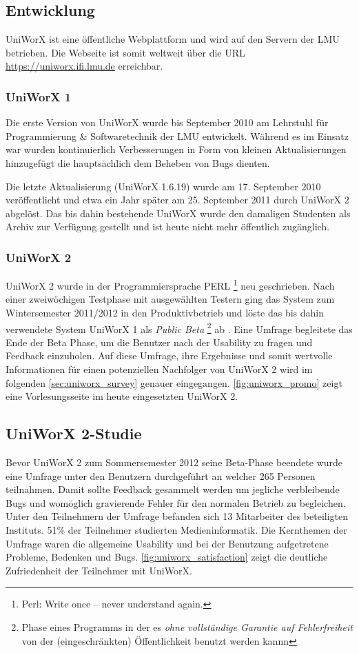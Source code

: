 \documentclass[11pt,a4paper,twoside,ngerman]{article}
\begin{document}
\subsection{Entwicklung} \label{sec:uniworx_development}
UniWorX ist eine öffentliche Webplattform und wird auf den Servern der LMU betrieben. Die Webseite ist somit weltweit über die URL \url{https://uniworx.ifi.lmu.de} erreichbar.

\subsubsection{UniWorX 1}
Die erste Version von UniWorX wurde bis September 2010 am Lehrstuhl für Programmierung \& Softwaretechnik der LMU entwickelt. Während es im Einsatz war wurden kontinuierlich Verbesserungen in Form von kleinen Aktualisierungen hinzugefügt die hauptsächlich dem Beheben von Bugs dienten.

Die letzte Aktualisierung (UniWorX 1.6.19) wurde am 17. September 2010 veröffentlicht und etwa ein Jahr später am 25. September 2011 durch UniWorX 2 abgelöst. Das bis dahin bestehende UniWorX wurde den damaligen Studenten als Archiv zur Verfügung gestellt und ist heute nicht mehr öffentlich zugänglich. \cite{web:pstifiuniworx}

\subsubsection{UniWorX 2}
UniWorX 2 wurde in der Programmiersprache PERL \footnote{Perl: Write once – never understand again.} neu geschrieben.
Nach einer zweiwöchigen Testphase mit ausgewählten Testern ging das System zum Wintersemester 2011/2012 in den Produktivbetrieb und löste das bis dahin verwendete System UniWorX 1 als \textit{Public Beta} \footnote{Phase eines Programms in der es \textit{ohne vollständige Garantie auf Fehlerfreiheit} von der (eingeschränkten) Öffentlichkeit benutzt werden kannn} ab \cite{web:uniworxchangelog}. Eine Umfrage begleitete das Ende der Beta Phase, um die Benutzer nach der Usability zu fragen und Feedback einzuholen. Auf diese Umfrage, ihre Ergebnisse und somit wertvolle Informationen für einen potenziellen Nachfolger von UniWorX 2 wird im folgenden \autoref{sec:uniworx_survey} genauer eingegangen. \autoref{fig:uniworx_promo} zeigt eine Vorlesungsseite im heute eingesetzten UniWorX 2.

\subsection{UniWorX 2-Studie} \label{sec:uniworx_survey}
Bevor UniWorX 2 zum Sommersemester 2012 seine Beta-Phase beendete wurde eine Umfrage unter den Benutzern durchgeführt an welcher 265 Personen teilnahmen. Damit sollte Feedback gesammelt werden um jegliche verbleibende Bugs und womöglich gravierende Fehler für den normalen Betrieb zu begleichen. Unter den Teilnehmern der Umfrage befanden sich 13 Mitarbeiter des beteiligten Instituts. 51\% der Teilnehmer studierten Medieninformatik.
Die Kernthemen der Umfrage waren die allgemeine Usability und bei der Benutzung aufgetretene Probleme, Bedenken und Bugs. \autoref{fig:uniworx_satisfaction} zeigt die deutliche Zufriedenheit der Teilnehmer mit UniWorX.
\end{document}
